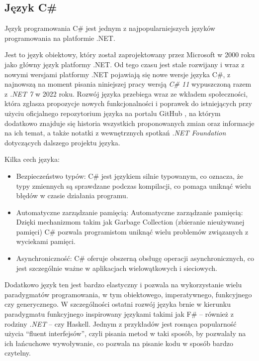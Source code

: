 \subsection{Język C\#}
\label{sec:csharp}

Język programowania C\# jest jednym z najpopularniejszych języków programowania na platformie .NET.

Jest to język obiektowy, który został zaprojektowany przez Microsoft w 2000 roku jako główny język platformy .NET.
Od tego czasu jest stale rozwijany i wraz z nowymi wersjami platformy .NET pojawiają się nowe wersje języka C\#, z najnowszą na moment pisania niniejszej pracy wersją \emph{C\# 11} wypuszczoną razem z \emph{.NET 7} w 2022 roku.
Rozwój języka przebiega wraz ze wkładem społeczności, która zgłasza propozycje nowych funkcjonalności i poprawek do istniejących przy użyciu oficjalnego repozytorium języka na portalu GitHub \cite{dotnet-csharplang-repo}, na którym dodatkowo znajduje się historia wszystkich proponowanych zmian oraz informacje na ich temat, a także notatki z wewnętrznych spotkań \emph{.NET Foundation} dotyczących dalszego projektu języka.

Kilka cech języka:

\begin{itemize}

  \item Bezpieczeństwo typów: C\# jest językiem silnie typowanym, co oznacza, że typy zmiennych są sprawdzane podczas kompilacji, co pomaga uniknąć wielu błędów w czasie działania programu.

  \item Automatyczne zarządzanie pamięcią: Automatyczne zarządzanie pamięcią: Dzięki mechanizmom takim jak Garbage Collection (zbieranie nieużywanej pamięci) C\# pozwala programistom uniknąć wielu problemów związanych z wyciekami pamięci.

  \item Asynchroniczność: C\# oferuje obszerną obsługę operacji asynchronicznych, co jest szczególnie ważne w aplikacjach wielowątkowych i sieciowych.

\end{itemize}

Dodatkowo język ten jest bardzo elastyczny i pozwala na wykorzystanie wielu paradygmatów programowania, w tym obiektowego, imperatywnego, funkcyjnego czy generycznego.
W szczególności ostatni rozwój języka brnie w kierunku paradygmatu funkcyjnego inspirowany językami takimi jak F\# -- również z rodziny \emph{.NET} -- czy Haskell.
Jednym z przykładów jest rosnąca popularność użycia ``fluent interfejsów'', czyli pisania metod w taki sposób, by pozwalały na ich łańcuchowe wywoływanie, co pozwala na pisanie kodu w sposób bardzo czytelny.

